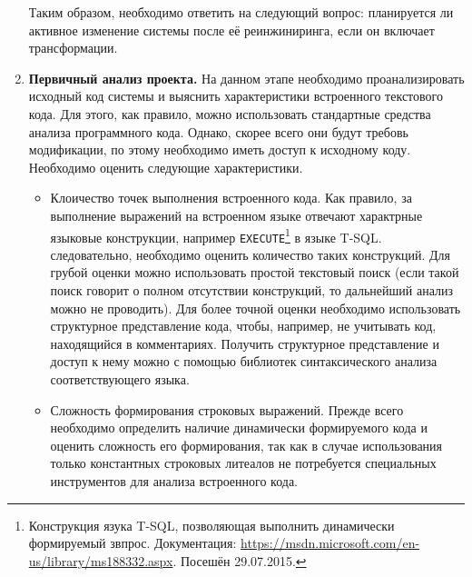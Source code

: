 \begin{enumerate}
  Таким образом, необходимо ответить на следующий вопрос: планируется ли активное изменение системы после её реинжиниринга, если он включает трансформации.
  
  \item \textbf{Первичный анализ проекта.} На данном этапе необходимо проанализировать исходный код системы и выяснить характеристики встроенного текстового кода. Для этого, как правило, можно использовать стандартные средства анализа программного кода. Однако, скорее всего они будут требовь модификации, по этому необходимо иметь доступ к исходному коду. Необходимо оценить следующие характеристики.
  \begin{itemize}
    \item Клоичество точек выполнения встроенного кода. Как правило, за выполнение выражений на встроенном языке отвечают характрные языковые конструкции, например \verb|EXECUTE|\footnote{Конструкция язука T-SQL, позволяющая выполнить динамически формируемый звпрос. Документация: \url{https://msdn.microsoft.com/en-us/library/ms188332.aspx}. Посешён 29.07.2015.} в языке T-SQL. следовательно, необходимо оценить количество таких конструкций. Для грубой оценки можно использовать простой текстовый поиск (если такой поиск говорит о полном отсутствии конструкций, то дальнейший анализ можно не проводить). Для более точной оценки необходимо использовать структурное представление кода, чтобы, например, не учитывать код, находящийся в комментариях. Получить структурное представление и доступ к нему можно с помощью библиотек синтаксического анализа соответствующего языка.
    
    \item Сложность формирования строковых выражений. Прежде всего необходимо определить наличие динамически формируемого кода и оценить сложность его формирования, так как в случае использования только константных строковых литеалов не потребуется специальных инструментов для анализа встроенного кода.
    

\end{itemize}
\end{enumerate}
